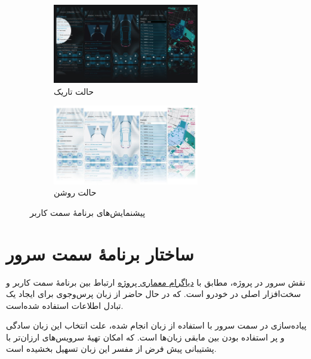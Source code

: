 \begin{figure}[!h]
	\centering
	\footnotesize
	\begin{subfigure}[t]{\linewidth}
		\centering
		\includegraphics[width=0.7\textwidth]{images/preview-dark.jpeg}
		\caption{حالت تاریک}
		\label{subfig1:fig1:sec2:chap4}
	\end{subfigure}
	\begin{subfigure}[t]{\linewidth}
		\centering
		\includegraphics[width=0.7\textwidth]{images/preview-light.jpeg}
		\caption{حالت روشن}
		\label{subfig2:fig1:sec2:chap4}
	\end{subfigure}
	\hspace*{1cm}
	\normalsize
	\label{fig1:sec2:chap4}
	\caption{پیشنمایش‌های برنامهٔ سمت کاربر}
\end{figure}

\section{ساختار برنامهٔ سمت سرور}\label{sec3:chap4}

نقش سرور در پروژه، مطابق با
\hyperref[fig1:sec1:chap4]{دیاگرام معماری پروژه}
 ارتباط بین برنامهٔ سمت کاربر و سخت‌افزار اصلی در خودرو است. که در حال حاضر از زبان پرس‌وجوی  برای ایجاد یک  تبادل اطلاعات استفاده شده‌است.

پیاده‌سازی  در سمت سرور با استفاده از زبان
انجام شده، علت انتخاب این زبان سادگی و پر استفاده بودن بین مابقی زبان‌ها است. که امکان تهیهٔ
سرویس‌های ارزان‌تر با پشتیبانی پیش فرض از مفسر این زبان تسهیل بخشیده است.


